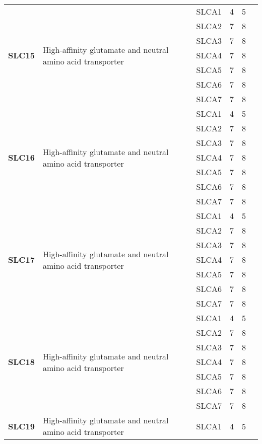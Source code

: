 \documentclass[12pt]{report}
\begin{document}
\begin{center}
\begin{longtable}{|p{1.5cm}|p{3.2cm}|p{1.9cm}|p{1.65cm}|p{3cm}|p{3cm}|}
\hline
\multirow{7}{1.5cm}{\textbf{SLC15}} & \multirow{7}{4cm}{High-affinity glutamate and neutral amino acid transporter} & SLCA1 & 4 & 5\\ 
\cline{3-6}
&&SLCA2&7 & 8&\\ 
\cline{3-6}
&&SLCA3&7 & 8&\\ 
\cline{3-6}
&&SLCA4&7 & 8&\\ 
\cline{3-6}
&&SLCA5&7 & 8&\\ 
\cline{3-6}
&&SLCA6&7 & 8&\\ 
\cline{3-6}
&&SLCA7&7 & 8&\\ 
\hline
\multirow{7}{1.5cm}{\textbf{SLC16}} & \multirow{7}{4cm}{High-affinity glutamate and neutral amino acid transporter} & SLCA1 & 4 & 5\\ 
\cline{3-6}
&&SLCA2&7 & 8&\\ 
\cline{3-6}
&&SLCA3&7 & 8&\\ 
\cline{3-6}
&&SLCA4&7 & 8&\\ 
\cline{3-6}
&&SLCA5&7 & 8&\\ 
\cline{3-6}
&&SLCA6&7 & 8&\\ 
\cline{3-6}
&&SLCA7&7 & 8&\\ 
\hline
\multirow{7}{1.5cm}{\textbf{SLC17}} & \multirow{7}{4cm}{High-affinity glutamate and neutral amino acid transporter} & SLCA1 & 4 & 5\\ 
\cline{3-6}
&&SLCA2&7 & 8&\\ 
\cline{3-6}
&&SLCA3&7 & 8&\\ 
\cline{3-6}
&&SLCA4&7 & 8&\\ 
\cline{3-6}
&&SLCA5&7 & 8&\\ 
\cline{3-6}
&&SLCA6&7 & 8&\\ 
\cline{3-6}
&&SLCA7&7 & 8&\\ 
\hline
\multirow{7}{1.5cm}{\textbf{SLC18}} & \multirow{7}{4cm}{High-affinity glutamate and neutral amino acid transporter} & SLCA1 & 4 & 5\\ 
\cline{3-6}
&&SLCA2&7 & 8&\\ 
\cline{3-6}
&&SLCA3&7 & 8&\\ 
\cline{3-6}
&&SLCA4&7 & 8&\\ 
\cline{3-6}
&&SLCA5&7 & 8&\\ 
\cline{3-6}
&&SLCA6&7 & 8&\\ 
\cline{3-6}
&&SLCA7&7 & 8&\\ 
\hline
\multirow{7}{1.5cm}{\textbf{SLC19}} & \multirow{7}{4cm}{High-affinity glutamate and neutral amino acid transporter} & SLCA1 & 4 & 5\\ 

\end{longtable}
\end{center}
\end{document}
